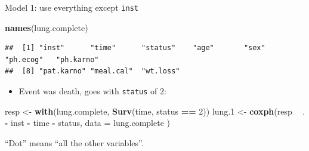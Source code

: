\documentclass[ignorenonframetext,]{beamer}
\newenvironment{Shaded}{\begin{snugshade}}{\end{snugshade}}
\newcommand{\DataTypeTok}[1]{\textcolor[rgb]{0.13,0.29,0.53}{#1}}
\newcommand{\DecValTok}[1]{\textcolor[rgb]{0.00,0.00,0.81}{#1}}
\newcommand{\FloatTok}[1]{\textcolor[rgb]{0.00,0.00,0.81}{#1}}
\newcommand{\KeywordTok}[1]{\textcolor[rgb]{0.13,0.29,0.53}{\textbf{#1}}}
\newcommand{\NormalTok}[1]{#1}
\newcommand{\OperatorTok}[1]{\textcolor[rgb]{0.81,0.36,0.00}{\textbf{#1}}}
\newcommand{\StringTok}[1]{\textcolor[rgb]{0.31,0.60,0.02}{#1}}
\providecommand{\tightlist}{%
  \setlength{\itemsep}{0pt}\setlength{\parskip}{0pt}}
\begin{document}
\begin{frame}[fragile]{Model 1: use everything except \texttt{inst}}
\protect\hypertarget{model-1-use-everything-except-inst}{}

\footnotesize

\begin{Shaded}
\begin{Highlighting}[]
\KeywordTok{names}\NormalTok{(lung.complete)}
\end{Highlighting}
\end{Shaded}

\begin{verbatim}
##  [1] "inst"      "time"      "status"    "age"       "sex"       "ph.ecog"   "ph.karno" 
##  [8] "pat.karno" "meal.cal"  "wt.loss"
\end{verbatim}

\normalsize

\begin{itemize}
\tightlist
\item
  Event was death, goes with \texttt{status} of 2:
\end{itemize}

\begin{Shaded}
\begin{Highlighting}[]
\NormalTok{resp <-}\StringTok{ }\KeywordTok{with}\NormalTok{(lung.complete, }\KeywordTok{Surv}\NormalTok{(time, status }\OperatorTok{==}\StringTok{ }\DecValTok{2}\NormalTok{))}
\NormalTok{lung}\FloatTok{.1}\NormalTok{ <-}\StringTok{ }\KeywordTok{coxph}\NormalTok{(resp }\OperatorTok{~}\StringTok{ }\NormalTok{. }\OperatorTok{-}\StringTok{ }\NormalTok{inst }\OperatorTok{-}\StringTok{ }\NormalTok{time }\OperatorTok{-}\StringTok{ }\NormalTok{status,}
  \DataTypeTok{data =}\NormalTok{ lung.complete}
\NormalTok{)}
\end{Highlighting}
\end{Shaded}

``Dot'' means ``all the other variables''.

\end{frame}
\end{document}
